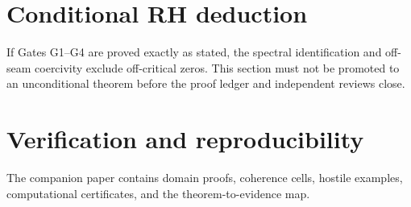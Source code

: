 \documentclass[11pt]{article}
\begin{document}
\section{Conditional RH deduction}
If Gates G1--G4 are proved exactly as stated, the spectral identification and off-seam coercivity exclude off-critical zeros. This section must not be promoted to an unconditional theorem before the proof ledger and independent reviews close.

\section{Verification and reproducibility}
The companion paper contains domain proofs, coherence cells, hostile examples, computational certificates, and the theorem-to-evidence map.
\end{document}
